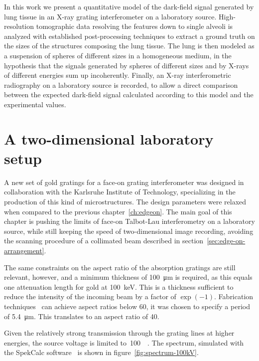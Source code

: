In this work we present a quantitative model of the dark-field signal
generated by lung tissue in an X-ray grating interferometer on a laboratory
source. High-resolution tomographic data resolving the features down to single
alveoli is analyzed with established post-processing techniques to extract a
ground truth on the sizes of the structures composing the lung tissue. The
lung is then modeled as a suspension of spheres of different sizes in a
homogeneous medium, in the hypothesis that the signals generated by spheres
of different sizes and by X-rays of different energies sum up incoherently.
Finally, an X-ray interferometric radiography on a laboratory source is
recorded, to allow a direct comparison between the expected dark-field
signal calculated according to this model and the experimental values.

\section{A two-dimensional laboratory setup}
A new set of gold gratings for a face-on grating interferometer was designed
in collaboration with the Karlsruhe Institute of Technology, specializing in
the production of this kind of microstructures. The design parameters were
relaxed when compared to the previous chapter~\ref{ch:edgeon}. The main goal
of this chapter is pushing the limits of face-on Talbot-Lau
interferometry on a laboratory source, while still keeping the speed of
two-dimensional image recording, avoiding the scanning procedure of a
collimated beam described in section~\ref{sec:edge-on-arrangement}.

The same constraints on the aspect ratio of the absorption gratings are
still relevant, however, and a minimum thickness of \SI{100}{\micro\meter}
is required, as this equals one attenuation length for gold at \SI{100}{\kilo\eV}.
This is a thickness sufficient to reduce the intensity of the incoming beam
by a factor of $\exp(-1)$. Fabrication
techniques~\parencite{David2007,Kenntner2010} can achieve aspect ratios below
\num{60}, it was chosen to specify a period of \SI{5.4}{\micro\meter}. This
translates to an aspect ratio of \num{40}.

Given the relatively strong transmission through the grating lines at higher
energies, the source voltage is limited to~\SI{100}{\kilo\voltpeak}. The
spectrum, simulated with the SpekCalc software~\parencite{spekcalc} is shown in
figure~\ref{fig:spectrum-100kV}.


